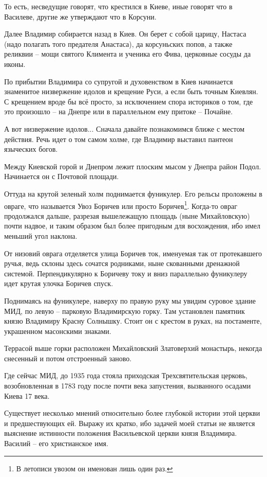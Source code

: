 \documentclass[a5paper,11pt,openany]{article}
\begin{document}
То есть, несведущие говорят, что крестился в Киеве, иные говорят что в Василеве, другие же утверждают что в Корсуни.

Далее Владимир собирается назад в Киев. Он берет с собой царицу, Настаса (надо полагать того предателя Анастаса), да корсуньских попов, а также реликвии – мощи святого Климента и ученика его Фива, церковные сосуды да иконы. 

По прибытии Владимира со супругой и духовенством в Киев начинается знаменитое низвержение идолов и крещение Руси, а если быть точным Киевлян. С крещением вроде бы всё просто, за исключением спора историков о том, где это произошло – на Днепре или в параллельном ему притоке – Почайне.

А вот низвержение идолов... Сначала давайте познакомимся ближе с местом действия. Речь идет о том самом холме, где Владимир выставил пантеон языческих богов.

Между Киевской горой и Днепром лежит плоским мысом у Днепра район Подол. Начинается он с Почтовой площади.

Оттуда на крутой зеленый холм поднимается фуникулер. Его рельсы проложены в овраге, что называется Увоз Боричев или просто Боричев\footnote{В летописи увозом он именован лишь один раз.}. Когда-то овраг продолжался дальше, разрезая вышележащую площадь (ныне Михайловскую) почти надвое, и таким образом был более пригодным для восхождения, ибо имел меньший угол наклона. 

От низовий оврага отделяется улица Боричев ток, именуемая так от протекавшего ручья, ведь склоны здесь сочатся родниками, ныне скованными дренажной системой. Перпендикулярно к Боричеву току и вниз параллельно фуникулеру идет крутая улочка Боричев спуск.

Поднимаясь на фуникулере, наверху по правую руку мы увидим суровое здание МИД, по левую – парковую Владимирскую горку. Там установлен памятник князю Владимиру Красну Солнышку. Стоит он с крестом в руках, на постаменте, украшенном масонскими знаками.

Террасой выше горки расположен Михайловский Златоверхий монастырь, некогда снесенный и потом отстроенный заново.

Где сейчас МИД, до 1935 года стояла приходская Трехсвятительская церковь, возобновленная в 1783 году после почти века запустения, вызванного осадами Киева 17 века.

Существует несколько мнений относительно более глубокой истории этой церкви и предшествующих ей. Выражу их кратко, ибо задачей моей статьи не является выяснение истинности положения Васильевской церкви князя Владимира. Василий – его христианское имя. 
\end{document}
